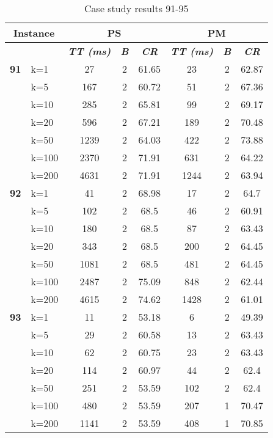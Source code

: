     \begin{table}[htbp]
    \caption{Case study results 91-95}
    \centering
    \begin{tabular}{|l|l|c|c|c|c|c|c|}
    \hline
    \multicolumn{ 2}{|c|}{\textbf{Instance}} & \multicolumn{ 3}{c|}{\textbf{PS}} & \multicolumn{ 3}{c|}{\textbf{PM}} \\ \hline
    \multicolumn{ 2}{|l|}{} & \textbf{\textit{TT (ms)}} & \textbf{\textit{B}} & \textbf{\textit{CR}} & \textbf{\textit{TT (ms)}} & \textbf{\textit{B}} & \textbf{\textit{CR}} \\ \hline
    \multicolumn{1}{|r|}{\textbf{91}} & k=1 & 27 & 2 & 61.65 & 23 & 2 & 62.87 \\ 
     & k=5 & 167 & 2 & 60.72 & 51 & 2 & 67.36 \\ 
     & k=10 & 285 & 2 & 65.81 & 99 & 2 & 69.17 \\ 
     & k=20 & 596 & 2 & 67.21 & 189 & 2 & 70.48 \\ 
     & k=50 & 1239 & 2 & 64.03 & 422 & 2 & 73.88 \\ 
     & k=100 & 2370 & 2 & 71.91 & 631 & 2 & 64.22 \\ 
     & k=200 & 4631 & 2 & 71.91 & 1244 & 2 & 63.94 \\ \hline
    \multicolumn{1}{|r|}{\textbf{92}} & k=1 & 41 & 2 & 68.98 & 17 & 2 & 64.7 \\ 
     & k=5 & 102 & 2 & 68.5 & 46 & 2 & 60.91 \\ 
     & k=10 & 180 & 2 & 68.5 & 87 & 2 & 63.43 \\ 
     & k=20 & 343 & 2 & 68.5 & 200 & 2 & 64.45 \\ 
     & k=50 & 1081 & 2 & 68.5 & 481 & 2 & 64.45 \\ 
     & k=100 & 2487 & 2 & 75.09 & 848 & 2 & 62.44 \\ 
     & k=200 & 4615 & 2 & 74.62 & 1428 & 2 & 61.01 \\ \hline
    \multicolumn{1}{|r|}{\textbf{93}} & k=1 & 11 & 2 & 53.18 & 6 & 2 & 49.39 \\ 
     & k=5 & 29 & 2 & 60.58 & 13 & 2 & 63.43 \\ 
     & k=10 & 62 & 2 & 60.75 & 23 & 2 & 63.43 \\ 
     & k=20 & 114 & 2 & 60.97 & 44 & 2 & 62.4 \\ 
     & k=50 & 251 & 2 & 53.59 & 102 & 2 & 62.4 \\ 
     & k=100 & 480 & 2 & 53.59 & 207 & 1 & 70.47 \\ 
     & k=200 & 1141 & 2 & 53.59 & 408 & 1 & 70.85 \\ \hline

\end{tabular}
\end{table}
